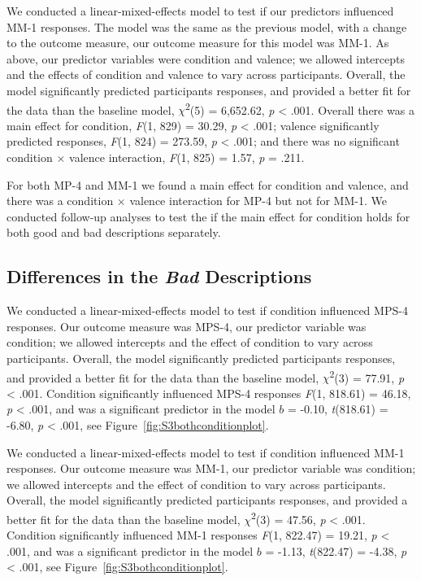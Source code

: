 \documentclass[
  man,floatsintext]{apa7}
\begin{document}
We conducted a linear-mixed-effects model to test if our predictors influenced MM-1 responses. The model was the same as the previous model, with a change to the outcome measure, our outcome measure for this model was MM-1. As above, our predictor variables were condition and valence; we allowed intercepts and the effects of condition and valence to vary across participants.
Overall, the model significantly predicted participants responses, and provided a better fit for the data than the baseline model,
\(\chi\)\textsuperscript{2}(5) = 6,652.62, \emph{p} \textless{} .001.
Overall there was a main effect for condition,
\emph{F}(1, 829) = 30.29, \emph{p} \textless{} .001;
valence significantly predicted responses,
\emph{F}(1, 824) = 273.59, \emph{p} \textless{} .001;
and there was no significant condition \(\times\) valence interaction,
\emph{F}(1, 825) = 1.57, \emph{p} = .211.

For both MP-4 and MM-1 we found a main effect for condition and valence, and there was a condition \(\times\) valence interaction for MP-4 but not for MM-1. We conducted follow-up analyses to test the if the main effect for condition holds for both good and bad descriptions separately.

\hypertarget{differences-in-the-bad-descriptions}{%
\subsection{\texorpdfstring{Differences in the \emph{Bad} Descriptions}{Differences in the Bad Descriptions}}\label{differences-in-the-bad-descriptions}}

We conducted a linear-mixed-effects model to test if condition influenced MPS-4 responses. Our outcome measure was MPS-4, our predictor variable was condition; we allowed intercepts and the effect of condition to vary across participants. Overall, the model significantly predicted participants responses, and provided a better fit for the data than the baseline model, \(\chi\)\textsuperscript{2}(3) = 77.91, \emph{p} \textless{} .001. Condition significantly influenced MPS-4 responses \emph{F}(1, 818.61) = 46.18, \emph{p} \textless{} .001, and was a significant predictor in the model \(b\) = -0.10, \emph{t}(818.61) = -6.80, \emph{p} \textless{} .001, see Figure~\ref{fig:S3bothconditionplot}.

We conducted a linear-mixed-effects model to test if condition influenced MM-1 responses. Our outcome measure was MM-1, our predictor variable was condition; we allowed intercepts and the effect of condition to vary across participants. Overall, the model significantly predicted participants responses, and provided a better fit for the data than the baseline model, \(\chi\)\textsuperscript{2}(3) = 47.56, \emph{p} \textless{} .001. Condition significantly influenced MM-1 responses \emph{F}(1, 822.47) = 19.21, \emph{p} \textless{} .001, and was a significant predictor in the model \(b\) = -1.13, \emph{t}(822.47) = -4.38, \emph{p} \textless{} .001, see Figure~\ref{fig:S3bothconditionplot}.
\end{document}
